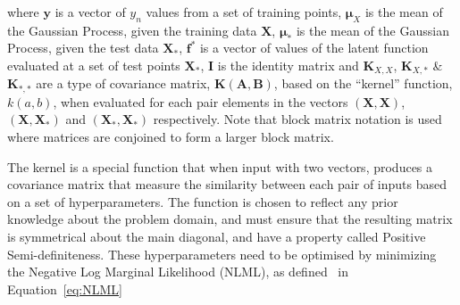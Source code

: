 \documentclass[12pt]{article}
\begin{document}


    where $\mathbf{y}$ is a vector of $y_n$ values from a set of training points, $\boldsymbol{\mu}_X$ is the mean of the Gaussian Process, given the training data $\mathbf{X}$, $\boldsymbol{\mu}_*$ is the mean of the Gaussian Process, given the test data $\mathbf{X}_*$, $\mathbf{f}^*$ is a vector of values of the latent function evaluated at a set of test points $\mathbf{X}_*$, $\mathbf{I}$ is the identity matrix and $\mathbf{K}_{X,X}$, $\mathbf{K}_{X,*}$ \& $\mathbf{K}_{*,*}$ are a type of covariance matrix, $\mathbf{K}(\mathbf{A},\mathbf{B})$, based on the ``kernel'' function, $k(a,b)$, when evaluated for each pair elements in the vectors $(\mathbf{X},\mathbf{X})$, $(\mathbf{X},\mathbf{X}_*)$ and $(\mathbf{X}_*,\mathbf{X}_*)$ respectively.
    Note that block matrix notation is used where matrices are conjoined to form a larger block matrix. 

    The kernel is a special function that when input with two vectors, produces a covariance matrix that measure the similarity between each pair of inputs based on a set of hyperparameters.
    The function is chosen to reflect any prior knowledge about the problem domain, and must ensure that the resulting matrix is symmetrical about the main diagonal, and have a property called Positive Semi-definiteness.
    These hyperparameters need to be optimised by minimizing the Negative Log Marginal Likelihood (NLML), as defined~\cite{murphy2023probabilistic} in Equation~\ref{eq:NLML}
\end{document}
